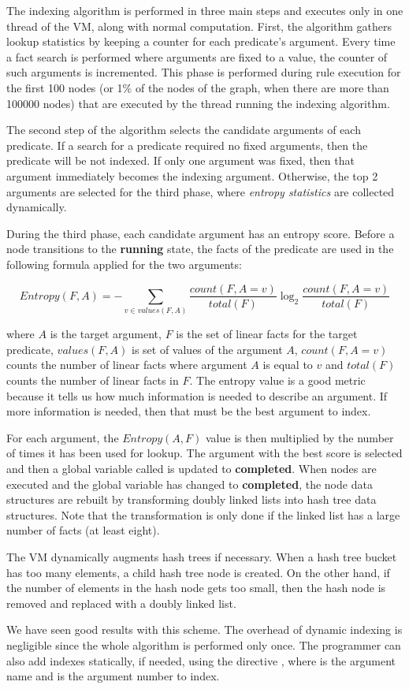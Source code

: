 The indexing algorithm is performed in three main steps and executes only in one
thread of the VM, along with normal computation. First, the algorithm gathers
lookup statistics by keeping a counter for each predicate's argument. Every time
a fact search is performed where arguments are fixed to a value, the counter of
such arguments is incremented. This phase is performed during rule execution for
the first 100 nodes (or 1\% of the nodes of the graph, when there are more than
100000 nodes) that are executed by the thread running the indexing algorithm.

The second step of the algorithm selects the candidate arguments of each
predicate. If a search for a predicate required no fixed arguments, then the
predicate will be not indexed. If only one argument was fixed, then that
argument immediately becomes the indexing argument. Otherwise, the top 2
arguments are selected for the third phase, where \emph{entropy statistics} are
collected dynamically.

During the third phase, each candidate argument has an entropy score. Before a
node transitions to the \textbf{running} state, the facts of the predicate are
used in the following formula applied for the two arguments:

\[
Entropy(F, A) = - \sum_{v \in values(F, A)} \frac{count(F, A = v)}{total(F)} \log_2 \frac{count(F, A = v)}{total(F)}
\]

\noindent where $A$ is the target argument, $F$ is the set of linear facts for
the target predicate, $values(F, A)$ is set of values of the argument $A$,
$count(F, A = v)$ counts the number of linear facts where argument $A$ is equal
to $v$ and $total(F)$ counts the number of linear facts in $F$.  The entropy
value is a good metric because it tells us how much information is needed to
describe an argument. If more information is needed, then that must be the best
argument to index.

For each argument, the $Entropy(A, F)$ value is then multiplied by the number of
times it has been used for lookup. The argument with the best score is selected
and then a global variable called  is updated to
\textbf{completed}. When nodes are executed and the global
 variable has changed to \textbf{completed}, the node data
structures are rebuilt by transforming doubly linked lists into hash tree data
structures. Note that the transformation is only done if the linked list has a
large number of facts (at least eight).

The VM dynamically augments hash trees if necessary. When a hash tree bucket
has too many elements, a child hash tree node is created.  On the other hand, if
the number of elements in the hash node gets too small, then the hash node is
removed and replaced with a doubly linked list.

We have seen good results with this scheme. The overhead of dynamic indexing is
negligible since the whole algorithm is performed only once.  The programmer can
also add indexes statically, if needed, using the directive , where  is the argument name and  is the argument
number to index.

